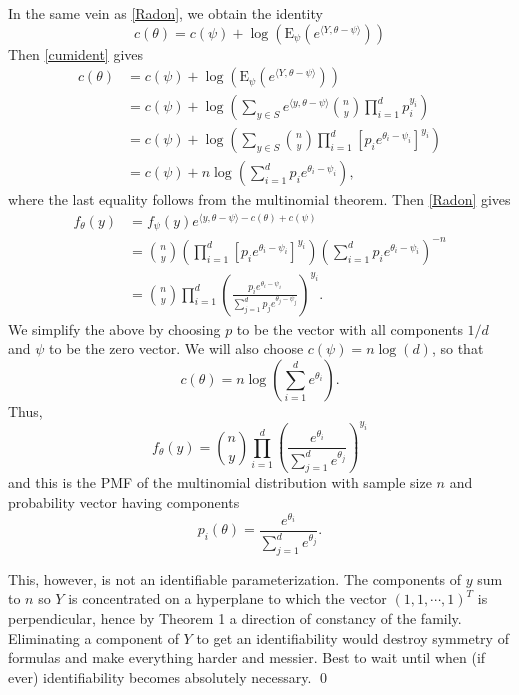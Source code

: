 \documentclass[12pt]{article}
\newcommand{\inner}[1]{\langle #1 \rangle}
\begin{document}
In the same vein as \eqref{Radon}, we obtain the identity
\begin{equation} \label{cumident}
	c(\theta) = c(\psi) + \log\left(\mathrm{E}_{\psi}\left(e^{\inner{Y, \theta - \psi}}\right)\right)
\end{equation}
Then \eqref{cumident} gives
\begin{align*}
  c(\theta) &= c(\psi) + \log\left(\mathrm{E}_{\psi}\left(e^{\inner{Y, \theta - \psi}}\right)\right) \\
  &= c(\psi) + \log\left(\sum_{y\in S} e^{\inner{y, \theta - \psi}}{n \choose y} \prod_{i=1}^d p_i^{y_i}\right) \\
  &= c(\psi) + \log\left(\sum_{y\in S} {n \choose y} \prod_{i=1}^d \left[p_ie^{\theta_i - \psi_i}\right]^{y_i}\right) \\  
  &= c(\psi) + n\log\left(\sum_{i=1}^d p_ie^{\theta_i - \psi_i}\right),
\end{align*}
where the last equality follows from the multinomial theorem. Then \eqref{Radon} gives
\begin{align*}
  f_{\theta}(y) &= f_{\psi}(y)e^{\inner{y,\theta-\psi} - c(\theta) + c(\psi)} \\
    &= {n \choose y} \left(\prod_{i=1}^d\left[p_ie^{\theta_i-\psi_i}\right]^{y_i}\right)\left(\sum_{i=1}^d p_ie^{\theta_i-\psi_i}\right)^{-n} \\
    &= {n \choose y} \prod_{i=1}^d \left(\frac{p_ie^{\theta_i-\psi_i}}{\sum_{j=1}^dp_je^{\theta_j-\psi_j}}\right)^{y_i}.
\end{align*}
We simplify the above by choosing $p$ to be the vector with all components $1/d$ and $\psi$ to be the zero vector. We will also choose $c(\psi) = n\log(d)$, so that
$$
  c(\theta) = n\log\left(\sum_{i=1}^d e^{\theta_i}\right).
$$
Thus,
$$
  f_{\theta}(y) = {n \choose y}\prod_{i=1}^d \left(\frac{e^{\theta_i}}{\sum_{j=1}^d e^{\theta_j}}\right)^{y_i}
$$
and this is the PMF of the multinomial distribution with sample size $n$ and probability vector having components
$$
  p_i(\theta) = \frac{e^{\theta_i}}{\sum_{j=1}^d e^{\theta_j}}.
$$

This, however, is not an identifiable parameterization. The components of $y$ sum to $n$ so $Y$ is concentrated on a hyperplane to which the vector $(1,1, \cdots, 1)^T$ is perpendicular, hence by Theorem 1 a direction of constancy of the family. Eliminating a component of $Y$ to get an identifiability would destroy symmetry of formulas and make everything harder and messier. Best to wait until when (if ever) identifiability becomes absolutely necessary. \qed
\end{document}
